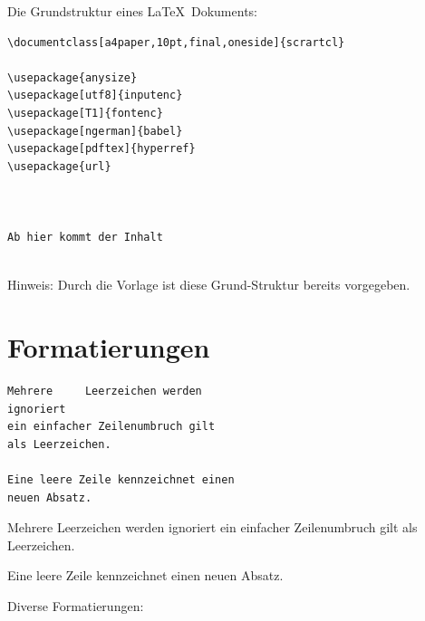 Die Grundstruktur eines \LaTeX\ Dokuments:
\begin{Verbatim}[frame=single]
\documentclass[a4paper,10pt,final,oneside]{scrartcl}	

\usepackage{anysize}
\usepackage[utf8]{inputenc}
\usepackage[T1]{fontenc}
\usepackage[ngerman]{babel}
\usepackage[pdftex]{hyperref}
\usepackage{url}
 


Ab hier kommt der Inhalt


\end{Verbatim}

Hinweis:
Durch die Vorlage ist diese Grund-Struktur bereits vorgegeben.

\section{Formatierungen}

\begin{minipage}[t]{0.6\linewidth}
\begin{Verbatim}[frame=single]
Mehrere     Leerzeichen werden 
ignoriert
ein einfacher Zeilenumbruch gilt 
als Leerzeichen.

Eine leere Zeile kennzeichnet einen 
neuen Absatz.
\end{Verbatim}
\end{minipage}
\begin{minipage}[t]{0.4\linewidth}
Mehrere     Leerzeichen werden ignoriert
ein einfacher Zeilenumbruch 
gilt als Leerzeichen.

Eine leere Zeile kennzeichnet 
einen neuen Absatz.
\end{minipage}

\vspace{1em}\noindent
Diverse Formatierungen:

